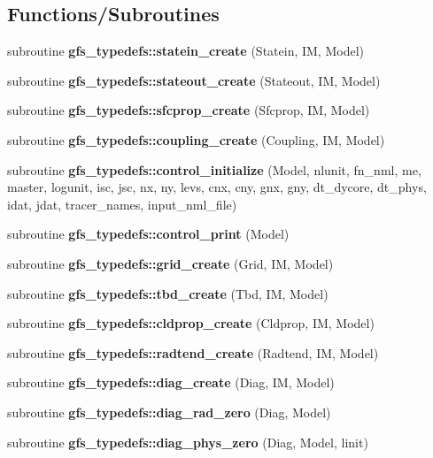 \subsection*{Functions/\+Subroutines}
\begin{DoxyCompactItemize}
\item 
subroutine \textbf{ gfs\+\_\+typedefs\+::statein\+\_\+create} (Statein, IM, Model)
\item 
subroutine \textbf{ gfs\+\_\+typedefs\+::stateout\+\_\+create} (Stateout, IM, Model)
\item 
subroutine \textbf{ gfs\+\_\+typedefs\+::sfcprop\+\_\+create} (Sfcprop, IM, Model)
\item 
subroutine \textbf{ gfs\+\_\+typedefs\+::coupling\+\_\+create} (Coupling, IM, Model)
\item 
subroutine \textbf{ gfs\+\_\+typedefs\+::control\+\_\+initialize} (Model, nlunit, fn\+\_\+nml, me, master, logunit, isc, jsc, nx, ny, levs, cnx, cny, gnx, gny, dt\+\_\+dycore, dt\+\_\+phys, idat, jdat, tracer\+\_\+names, input\+\_\+nml\+\_\+file)
\item 
subroutine \textbf{ gfs\+\_\+typedefs\+::control\+\_\+print} (Model)
\item 
subroutine \textbf{ gfs\+\_\+typedefs\+::grid\+\_\+create} (Grid, IM, Model)
\item 
subroutine \textbf{ gfs\+\_\+typedefs\+::tbd\+\_\+create} (Tbd, IM, Model)
\item 
subroutine \textbf{ gfs\+\_\+typedefs\+::cldprop\+\_\+create} (Cldprop, IM, Model)
\item 
subroutine \textbf{ gfs\+\_\+typedefs\+::radtend\+\_\+create} (Radtend, IM, Model)
\item 
subroutine \textbf{ gfs\+\_\+typedefs\+::diag\+\_\+create} (Diag, IM, Model)
\item 
subroutine \textbf{ gfs\+\_\+typedefs\+::diag\+\_\+rad\+\_\+zero} (Diag, Model)
\item 
subroutine \textbf{ gfs\+\_\+typedefs\+::diag\+\_\+phys\+\_\+zero} (Diag, Model, linit)
\end{DoxyCompactItemize}
